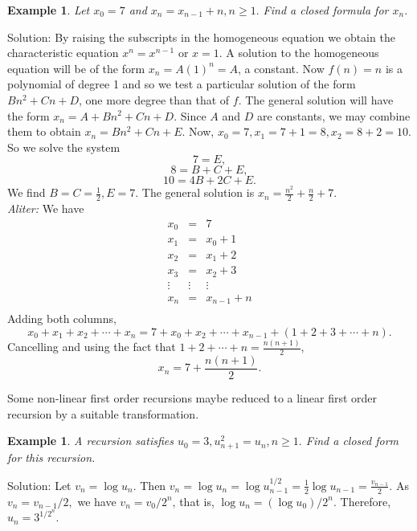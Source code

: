 \documentclass[11pt, openany]{book}
\theoremstyle{change} \theoremheaderfont{\blue\sffamily\bfseries}
\newtheorem{exa}[thm]{Example}
\theoremstyle{nonumberplain} \theoremheaderfont{\sffamily\bfseries}
\newcommand{\dis}{\displaystyle}
\newcommand{\í}{\'{\i}}
\begin{document}
\begin{exa} Let $x_0 = 7$ and $x_n = x_{n - 1} + n, n \geq 1.$ Find a closed formula for $x_n.$ \end{exa}
Solution: By raising the subscripts in the homogeneous equation
we obtain the characteristic equation $x^n = x^{n - 1}$ or $x =
1$. A solution to the homogeneous equation will be of the form
$x_n = A(1)^n = A$, a constant. Now $f(n) = n$ is a polynomial of
degree 1 and so we test a particular solution of the form $Bn^2 +
Cn + D$, one more degree than that of $f$. The general solution
will have the form $x_n = A + Bn^2  + Cn + D$. Since $A$ and $D$
are constants, we may combine them to obtain $x_n = Bn^2 + Cn +
E.$ Now, $x_0 = 7, x_1 = 7 + 1 = 8, x_2 = 8 + 2 = 10.$ So we solve
the system
$$7 = E,$$
$$8 = B + C + E,$$
$$10 = 4B + 2C + E.$$ We find $\dis{B = C = \frac{1}{2}, E = 7}$. The general solution is
$\dis{x_n = \frac{n^2}{2} + \frac{n}{2} + 7}$. \\
{\em Aliter:} We have
$$
\begin{array}{lcl}
x_0 & = & 7 \\
x_1 & = & x_0 + 1 \\
x_2 & = & x_1  + 2\\
x_3 & = & x_2  + 3\\
\vdots & \vdots & \vdots \\
x_n & = & x_{n-1} + n \\
\end{array}
$$
Adding both columns,
$$x_0 + x_1 + x_2 + \cdots + x_n = 7 + x_0 + x_2 + \cdots + x_{n - 1} + (1 + 2 + 3 + \cdots + n).$$
Cancelling and using the fact that $\dis{1 + 2 + \cdots + n =
\frac{n(n + 1)}{2}}$,
$$x_n = 7 + \frac{n(n + 1)}{2}.$$




Some non-linear first order recursions maybe reduced to a linear
first order recursion by a suitable transformation.
\begin{exa}
A recursion satisfies $u_0 = 3, u_{n + 1} ^2 = u_{n}, n \geq 1.$
Find a closed form for this recursion.

\end{exa}
Solution: Let $v_n = \log u_n.$ Then $v_{n } = \log u_{n } = \log
u_{n - 1} ^{1/2} = \frac{1}{2} \log u_{n - 1} = \frac{v_{n -
1}}{2}.$ As $v_n = v_{n - 1}/2,$ we have $v_n = v_0/2^n$, that is,
$\log u_n = (\log u_0)/2^n$. Therefore, $u_n = 3^{1/2^n}.$
\end{document}
